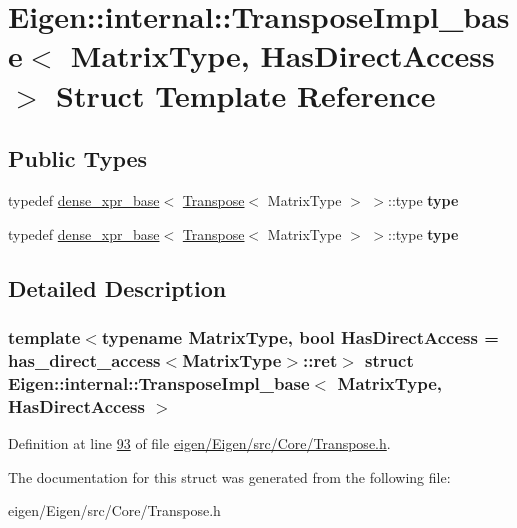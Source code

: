 \hypertarget{struct_eigen_1_1internal_1_1_transpose_impl__base}{}\section{Eigen\+:\+:internal\+:\+:Transpose\+Impl\+\_\+base$<$ Matrix\+Type, Has\+Direct\+Access $>$ Struct Template Reference}
\label{struct_eigen_1_1internal_1_1_transpose_impl__base}
\subsection*{Public Types}
\begin{DoxyCompactItemize}
\item 
\mbox{\label{struct_eigen_1_1internal_1_1_transpose_impl__base_aeda2dc3dbe38d55d64d6bfa76ee19396}} 
typedef \hyperlink{struct_eigen_1_1internal_1_1dense__xpr__base}{dense\+\_\+xpr\+\_\+base}$<$ \hyperlink{group___core___module_class_eigen_1_1_transpose}{Transpose}$<$ Matrix\+Type $>$ $>$\+::type {\bfseries type}
\item 
\mbox{\label{struct_eigen_1_1internal_1_1_transpose_impl__base_aeda2dc3dbe38d55d64d6bfa76ee19396}} 
typedef \hyperlink{struct_eigen_1_1internal_1_1dense__xpr__base}{dense\+\_\+xpr\+\_\+base}$<$ \hyperlink{group___core___module_class_eigen_1_1_transpose}{Transpose}$<$ Matrix\+Type $>$ $>$\+::type {\bfseries type}
\end{DoxyCompactItemize}


\subsection{Detailed Description}
\subsubsection*{template$<$typename Matrix\+Type, bool Has\+Direct\+Access = has\+\_\+direct\+\_\+access$<$\+Matrix\+Type$>$\+::ret$>$\newline
struct Eigen\+::internal\+::\+Transpose\+Impl\+\_\+base$<$ Matrix\+Type, Has\+Direct\+Access $>$}



Definition at line \hyperlink{eigen_2_eigen_2src_2_core_2_transpose_8h_source_l00093}{93} of file \hyperlink{eigen_2_eigen_2src_2_core_2_transpose_8h_source}{eigen/\+Eigen/src/\+Core/\+Transpose.\+h}.



The documentation for this struct was generated from the following file\+:\begin{DoxyCompactItemize}
\item 
eigen/\+Eigen/src/\+Core/\+Transpose.\+h\end{DoxyCompactItemize}
